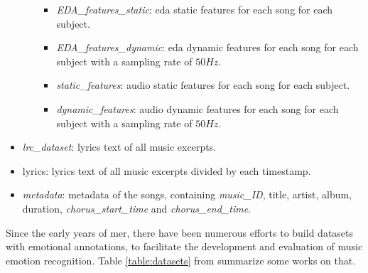 \begin{itemize}
\begin{itemize}
\begin{itemize}
			\item \textit{EDA\_features\_static}: \gls{eda} static features for each song for each subject.
			\item \textit{EDA\_features\_dynamic}: \gls{eda} dynamic features for each song for each subject with a sampling rate of $50Hz$.
		\end{itemize}
		\begin{itemize}
			\item \textit{static\_features}: audio static features for each song for each subject.
			\item \textit{dynamic\_features}: audio dynamic features for each song for each subject with a sampling rate of $50Hz$.
		\end{itemize}
	\end{itemize}
	\item \textit{lrc\_dataset}: lyrics text of all music excerpts.
	\item lyrics:  lyrics text of all music excerpts divided by each timestamp.
	\item \textit{metadata}: metadata of the songs, containing \textit{music\_ID}, title, artist, album, duration, \textit{chorus\_start\_time} and \textit{chorus\_end\_time}.
\end{itemize}
\newpage
Since the early years of \gls{mer}, there have been numerous efforts to build datasets with emotional annotations, to facilitate the development and evaluation of music emotion recognition. Table \ref{table:datasets} from \cite{zhang2018pmemo} summarize some works on that.
